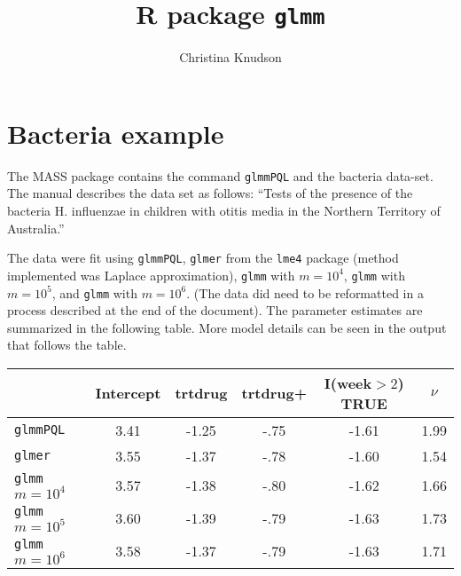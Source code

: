 \documentclass{article}
\title{R package \texttt{glmm}}
\author{Christina Knudson}
\begin{document}
\maketitle{}

\section{Bacteria example}
The MASS package contains the command \texttt{glmmPQL} and the bacteria data-set. The manual describes the data set as follows: ``Tests of the presence of the bacteria H. influenzae in children with otitis media in the Northern Territory of Australia.''

The data were fit using \texttt{glmmPQL},  \texttt{glmer}  from the \texttt{lme4} package (method implemented was Laplace approximation),  \texttt{glmm} with $m=10^4$,  \texttt{glmm} with $m=10^5$, and \texttt{glmm} with $m=10^6$. (The data did need to be reformatted in a process described at the end of the document). The parameter estimates are summarized in the following table. More model details can be seen in the output that follows the table.

\begin{tabular}{lccccc}
& Intercept & trtdrug & trtdrug+ & I(week$>2$) TRUE & $\nu$ \\ \hline
\texttt{glmmPQL} & 3.41 & -1.25 & -.75 & -1.61 & 1.99\\
\texttt{glmer} & 3.55 & -1.37 & -.78 & -1.60 & 1.54\\
\texttt{glmm} $m=10^4$ & 3.57 & -1.38 & -.80 & -1.62 & 1.66 \\
\texttt{glmm} $m=10^5$ & 3.60& -1.39 & -.79 & -1.63 & 1.73 \\
\texttt{glmm} $m=10^6$ & 3.58& -1.37 & -.79 & -1.63 & 1.71 \\
\end{tabular}
\end{document}
